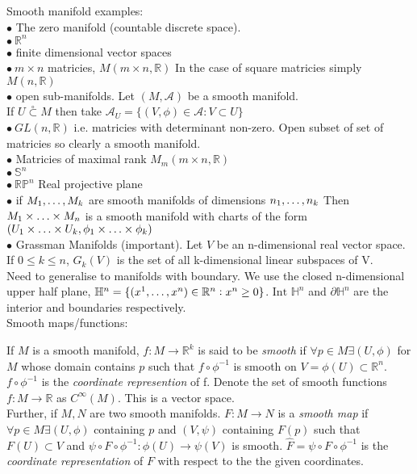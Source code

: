 \documentclass[14pt, twocolumn]{article}
\newcommand{\opsubset}{\overset{\circ}{\subset}}
\newcommand{\R}{\mathbb{R}}
\newcommand{\me}{\mathellipsis}
\newcommand{\intr}{\textrm{Int }}
\begin{document}
	Smooth manifold examples:\\
	$\bullet$ The zero manifold (countable discrete space).\\
	$\bullet \ \R^n$\\
	$\bullet$ finite dimensional vector spaces\\
	$\bullet \ m \times n$ matricies, $M(m \times n, \R)$ In the case of square matricies simply $M(n,\R)$ \\
	$\bullet$ open sub-manifolds. Let $(M,\mathcal{A})$ be a smooth manifold. 
	\\If $U \opsubset M$ then take $\mathcal{A}_U = \{ (V,\phi) \in \mathcal{A} : V \subset U\}$\\
	$\bullet \ GL(n,\R)$ i.e. matricies with determinant non-zero. Open subset of set of matricies so clearly a smooth manifold.\\
	$\bullet$ Matricies of maximal rank $M_m(m\times n,\R)$\\
	$\bullet \ \mathbb{S}^n$\\
	$\bullet \ \R \mathbb{P}^n$ Real projective plane\\
	$\bullet$ if $M_1 , \mathellipsis , M_k$ are smooth manifolds of dimensions $n_1 , \mathellipsis , n_k$ Then $M_1 \times \mathellipsis \times M_n$ is a smooth manifold with charts of the form $(U_1 \times \mathellipsis \times U_k , \phi_1 \times \mathellipsis \times \phi_k)$\\
	$\bullet$ Grassman Manifolds (important). Let $V$ be an n-dimensional real vector space. If $0 \leq k \leq n$, $G_k(V)$ is the set of all k-dimensional linear subspaces of V.\\

	Need to generalise to manifolds with boundary. We use the closed n-dimensional upper half plane, $\mathbb{H}^n = \{(x^1,\me, x^n) \in \R^n : x^n \geq 0\}$. $\intr\mathbb{H}^n$ and $\partial \mathbb{H}^n$ are the interior and boundaries respectively.\\

	Smooth maps/functions:

	If $M$ is a smooth manifold, $f : M \to \R^k$ is said to be \textit{smooth} if $\forall p \in M \exists (U,\phi)$ for $M$ whose domain contains $p$ such that $f \circ \phi^{-1}$ is smooth on $V = \phi(U) \subset \R^n$. $f \circ \phi^{-1}$ is the \textit{coordinate represention} of f.
	Denote the set of smooth functions $f : M \to \R$ as $C^\infty(M)$. This is a vector space.\\

	Further, if $M , N$ are two smooth manifolds. $F : M \to N$ is a \textit{smooth map} if $\forall p \in M \exists (U,\phi)$ containing $p$ and $(V,\psi)$ containing $F(p)$ such that $F(U) \subset V$ and $\psi \circ F \circ \phi^{-1} : \phi(U) \to \psi(V)$ is smooth. $\hat{F} = \psi \circ F \circ \phi^{-1}$ is the \textit{coordinate representation} of $F$ with respect to the the given coordinates.\\
\end{document}
